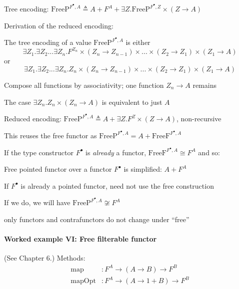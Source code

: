 Tree encoding: {\footnotesize{}$\text{FreeP}^{F^{\bullet},A}\triangleq A+F^{A}+\exists Z.\text{FreeP}^{F^{\bullet},Z}\times\left(Z\rightarrow A\right)$}{\footnotesize\par}

Derivation of the reduced encoding:

The tree encoding of a value $\text{FreeP}^{F^{\bullet},A}$ is either{\footnotesize{}
\[
\exists Z_{1}.\exists Z_{2}...\exists Z_{n}.F^{Z_{n}}\times\left(Z_{n}\rightarrow Z_{n-1}\right)\times...\times\left(Z_{2}\rightarrow Z_{1}\right)\times\left(Z_{1}\rightarrow A\right)
\]
}or{\footnotesize{}
\[
\exists Z_{1}.\exists Z_{2}...\exists Z_{n}.Z_{n}\times\left(Z_{n}\rightarrow Z_{n-1}\right)\times...\times\left(Z_{2}\rightarrow Z_{1}\right)\times\left(Z_{1}\rightarrow A\right)
\]
}{\footnotesize\par}

Compose all functions by associativity; one function $Z_{n}\rightarrow A$
remains

The case $\exists Z_{n}.Z_{n}\times\left(Z_{n}\rightarrow A\right)$
is equivalent to just $A$

Reduced encoding: {\footnotesize{}$\text{FreeP}^{F^{\bullet},A}\triangleq A+\exists Z.F^{Z}\times\left(Z\rightarrow A\right)$,
}non-recursive

This reuses the free functor as $\text{FreeP}^{F^{\bullet},A}=A+\text{FreeF}^{F^{\bullet},A}$

If the type constructor $F^{\bullet}$ is \emph{already} a functor,
$\text{FreeF}^{F^{\bullet},A}\cong F^{A}$ and so:

Free pointed functor over a functor $F^{\bullet}$ is simplified:
$A+F^{A}$

If $F^{\bullet}$ is already a pointed functor, need not use the free
construction

If we do, we will have $\text{FreeP}^{F^{\bullet},A}\not\cong F^{A}$ 

only functors and contrafunctors do not change under \textsf{``}free\textsf{''}


\paragraph{Worked example VI: Free filterable functor}

(See Chapter 6.) Methods:
\begin{align*}
\text{map} & :F^{A}\rightarrow\left(A\rightarrow B\right)\rightarrow F^{B}\\
\text{mapOpt} & :F^{A}\rightarrow\left(A\rightarrow1+B\right)\rightarrow F^{B}
\end{align*}

